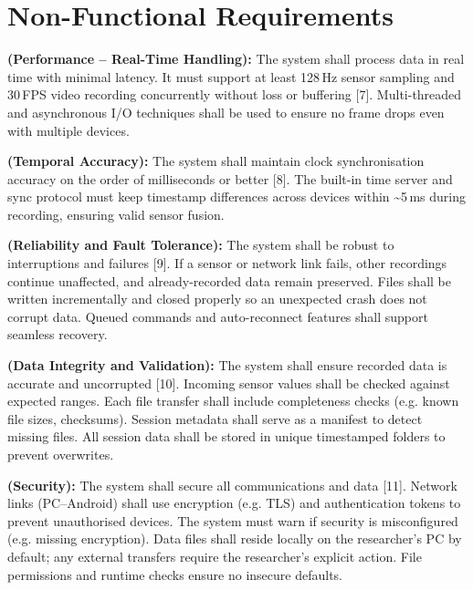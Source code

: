 \section{Non-Functional Requirements}

\begin{description}[style=unboxed,leftmargin=0cm]
    \item[\textbf{NFR1}] \textbf{(Performance – Real-Time Handling):} The system shall process data in real time with minimal latency. It must support at least 128\,Hz sensor sampling and 30\,FPS video recording concurrently without loss or buffering [7]. Multi-threaded and asynchronous I/O techniques shall be used to ensure no frame drops even with multiple devices.

    \item[\textbf{NFR2}] \textbf{(Temporal Accuracy):} The system shall maintain clock synchronisation accuracy on the order of milliseconds or better [8]. The built-in time server and sync protocol must keep timestamp differences across devices within \textasciitilde5\,ms during recording, ensuring valid sensor fusion.

    \item[\textbf{NFR3}] \textbf{(Reliability and Fault Tolerance):} The system shall be robust to interruptions and failures [9]. If a sensor or network link fails, other recordings continue unaffected, and already-recorded data remain preserved. Files shall be written incrementally and closed properly so an unexpected crash does not corrupt data. Queued commands and auto-reconnect features shall support seamless recovery.

    \item[\textbf{NFR4}] \textbf{(Data Integrity and Validation):} The system shall ensure recorded data is accurate and uncorrupted [10]. Incoming sensor values shall be checked against expected ranges. Each file transfer shall include completeness checks (e.g. known file sizes, checksums). Session metadata shall serve as a manifest to detect missing files. All session data shall be stored in unique timestamped folders to prevent overwrites.

    \item[\textbf{NFR5}] \textbf{(Security):} The system shall secure all communications and data [11]. Network links (PC–Android) shall use encryption (e.g. TLS) and authentication tokens to prevent unauthorised devices. The system must warn if security is misconfigured (e.g. missing encryption). Data files shall reside locally on the researcher’s PC by default; any external transfers require the researcher’s explicit action. File permissions and runtime checks ensure no insecure defaults.


\end{description}
